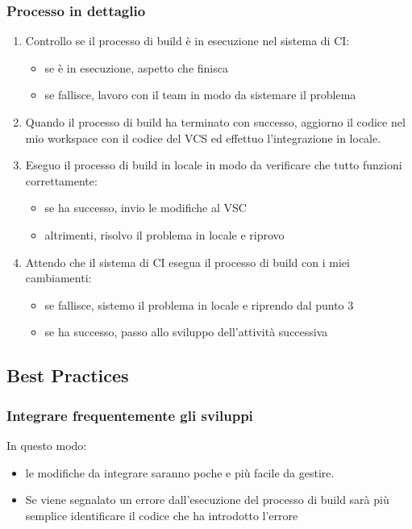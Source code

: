 \subsubsection{Processo in dettaglio}
\begin{enumerate}
    \item Controllo se il processo di build è in esecuzione nel sistema di CI:
    \begin{itemize}
        \item se è in esecuzione, aspetto che finisca
        \item se fallisce, lavoro con il team in modo da sistemare il problema
    \end{itemize}
    \item Quando il processo di build ha terminato con successo, aggiorno il codice nel mio workspace con il codice del VCS ed effettuo l’integrazione in locale.
    \item Eseguo il processo di build in locale in modo da verificare che tutto funzioni correttamente:
    \begin{itemize}
        \item se ha successo, invio le modifiche al VSC
        \item altrimenti, risolvo il problema in locale e riprovo
    \end{itemize}
    \item Attendo che il sistema di CI esegua il processo di build con i miei cambiamenti:
    \begin{itemize}
        \item se fallisce, sistemo il problema in locale e riprendo dal punto 3
        \item se ha successo, passo allo sviluppo dell’attività successiva
    \end{itemize}
\end{enumerate}

\subsection{Best Practices}

\subsubsection{Integrare frequentemente gli sviluppi}
In questo modo:
\begin{itemize}
    \item le modifiche da integrare saranno poche e più facile da gestire.
    \item Se viene segnalato un errore dall’esecuzione del processo di build sarà più semplice
    identificare il codice che ha introdotto l’errore
\end{itemize}

